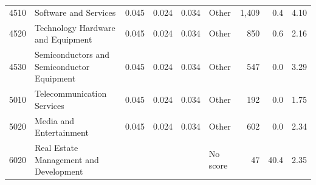 \begin{tabular}{llrrrlrrr}
4510 & Software and Services & 0.045 & 0.024 & 0.034 & Other & 1,409 & 0.4 & 4.10 \\
4520 & Technology Hardware and Equipment & 0.045 & 0.024 & 0.034 & Other & 850 & 0.6 & 2.16 \\
4530 & Semiconductors and Semiconductor Equipment & 0.045 & 0.024 & 0.034 & Other & 547 & 0.0 & 3.29 \\
5010 & Telecommunication Services & 0.045 & 0.024 & 0.034 & Other & 192 & 0.0 & 1.75 \\
5020 & Media and Entertainment & 0.045 & 0.024 & 0.034 & Other & 602 & 0.0 & 2.34 \\
6020 & Real Estate Management and Development &  &  &  & No score & 47 & 40.4 & 2.35 \\
\bottomrule
\end{tabular}
